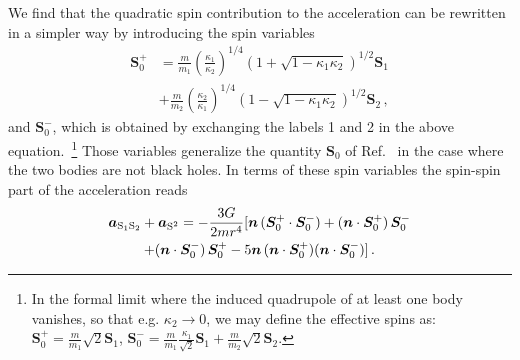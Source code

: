 \documentclass[aps, prd,
twocolumn,%
superscriptaddress,
showpacs, nofootinbib, eqsecnum, amsmath, amssymb, floatfix
]{revtex4}
\newcommand{\bmSeffp}{{\bm{S}_{0}^+}}
\newcommand{\bmSeffm}{{\bm{S}_{0}^-}}
\begin{document}
We find that the quadratic spin contribution to the acceleration can
be rewritten in a simpler way by introducing the spin variables
%
\begin{align}
\bmSeffp &= \frac{m}{m_1} \left(\frac{\kappa_1}{\kappa_2}
\right)^{1/4} (1+ \sqrt{1-\kappa_1 \kappa_2})^{1/2} \bm{S}_1 \nonumber \\ &+
\frac{m}{m_2} \left(\frac{\kappa_2}{\kappa_1}
\right)^{1/4} (1- \sqrt{1-\kappa_1 \kappa_2})^{1/2} \bm{S}_2 \, ,
\end{align}
%
and $\bmSeffm$, which is obtained by exchanging the labels 1 and 2
in the above equation.~\footnote{In the formal limit where the
induced quadrupole of
  at least one body vanishes, so that e.g. $\kappa_2 \to 0$, we may define the
  effective spins as: $\bmSeffp = \frac{m}{m_1} \sqrt{2} \bm{S}_1$, $\bmSeffm
  = \frac{m}{m_1} \frac{\kappa_1}{\sqrt{2}} \bm{S}_1 + \frac{m}{m_2} \sqrt{2}
  \bm{S}_2$.} Those variables generalize the quantity $\bm{S}_0$ of
Ref.~\cite{Damour01c} in the case where the two bodies are not black
holes. In terms of these spin variables the spin-spin part of the
acceleration reads
%
\begin{multline}
\label{eq:ssaccel}
\bm{a}_{\rm S_1 S_2} + \bm{a}_{\text{S}^2} = - \frac{3G}{2 m r^4} [ \bm{n} \,
(\bmSeffp \cdot \bmSeffm) + (\bm{n} \cdot
\bmSeffp) \, \bmSeffm
\\   +  (\bm{n} \cdot \bmSeffm) \, \bmSeffp -
5  \bm{n} \, (\bm{n} \cdot \bmSeffp)  (\bm{n} \cdot
\bmSeffm) ]
\, .
\end{multline}
\end{document}
